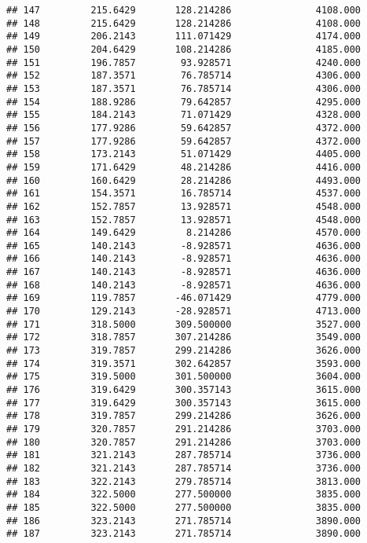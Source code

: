 \documentclass[]{article}
\begin{document}
\begin{verbatim}
## 147         215.6429       128.214286               4108.000
## 148         215.6429       128.214286               4108.000
## 149         206.2143       111.071429               4174.000
## 150         204.6429       108.214286               4185.000
## 151         196.7857        93.928571               4240.000
## 152         187.3571        76.785714               4306.000
## 153         187.3571        76.785714               4306.000
## 154         188.9286        79.642857               4295.000
## 155         184.2143        71.071429               4328.000
## 156         177.9286        59.642857               4372.000
## 157         177.9286        59.642857               4372.000
## 158         173.2143        51.071429               4405.000
## 159         171.6429        48.214286               4416.000
## 160         160.6429        28.214286               4493.000
## 161         154.3571        16.785714               4537.000
## 162         152.7857        13.928571               4548.000
## 163         152.7857        13.928571               4548.000
## 164         149.6429         8.214286               4570.000
## 165         140.2143        -8.928571               4636.000
## 166         140.2143        -8.928571               4636.000
## 167         140.2143        -8.928571               4636.000
## 168         140.2143        -8.928571               4636.000
## 169         119.7857       -46.071429               4779.000
## 170         129.2143       -28.928571               4713.000
## 171         318.5000       309.500000               3527.000
## 172         318.7857       307.214286               3549.000
## 173         319.7857       299.214286               3626.000
## 174         319.3571       302.642857               3593.000
## 175         319.5000       301.500000               3604.000
## 176         319.6429       300.357143               3615.000
## 177         319.6429       300.357143               3615.000
## 178         319.7857       299.214286               3626.000
## 179         320.7857       291.214286               3703.000
## 180         320.7857       291.214286               3703.000
## 181         321.2143       287.785714               3736.000
## 182         321.2143       287.785714               3736.000
## 183         322.2143       279.785714               3813.000
## 184         322.5000       277.500000               3835.000
## 185         322.5000       277.500000               3835.000
## 186         323.2143       271.785714               3890.000
## 187         323.2143       271.785714               3890.000

\end{verbatim}
\end{document}
